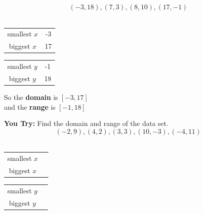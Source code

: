 \documentclass[12pt]{article}
\begin{document}
$$(-3,18),(7,3),(8,10),(17,-1)$$\\

\begin{multicols}{2}
\begin{center}
	\begin{tabular}{c | c}
	
		smallest $x$ & -3 \\
	
		biggest $x$ & 17\\
	
	\end{tabular}
\end{center}

\begin{center}
	\begin{tabular}{c | c}
	
		smallest $y$ & -1 \\
		
		biggest $y$ & 18\\
	
	\end{tabular}
\end{center}

\end{multicols}

\vspace{1cm}

So the \textbf{domain} is $[-3,17]$\\

and the \textbf{range} is $[-1,18]$\\

\hrulefill

\textbf{You Try:} Find the domain and range of the data set.\\

$$(-2,9),(4,2),(3,3),(10,-3),(-4,11)$$\\

\begin{multicols}{2}
\begin{center}
	\begin{tabular}{c | c}
	
		smallest $x$ &  \\
	
		biggest $x$ & \\
	
	\end{tabular}
\end{center}

\begin{center}
	\begin{tabular}{c | c}
	
		smallest $y$ &  \\
		
		biggest $y$ & \\
	
	\end{tabular}
\end{center}
\end{multicols}
\end{document}
